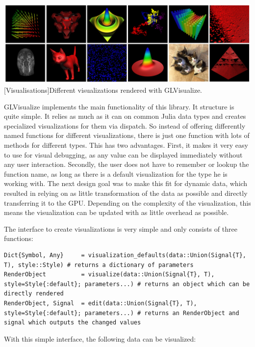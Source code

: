 \vspace{1em}
\begin{minipage}{\linewidth}
    \centering
    \includegraphics[width=0.9\linewidth]{graphics/glvisualize.jpg}
    [Visualisations]{Different visualizations rendered with GLVisualize.}
    \label{fig:glvisualize}
\end{minipage}

GLVisualize implements the main functionality of this library.
It structure is quite simple. 
It relies as much as it can on common Julia data types and creates specialized visualizations for them via dispatch.
So instead of offering differently named functions for different visualizations, there is just one function with lots of methods for different types.
This has two advantages.
First, it makes it very easy to use for visual debugging, as any value can be displayed immediately without any user interaction.
Secondly, the user does not have to remember or lookup the function name, as long as there is a default visualization for the type he is working with.
The next design goal was to make this fit for dynamic data, which resulted in relying on as little transformation of the data as possible and directly transferring it to the GPU.
Depending on the complexity of the visualization, this means the visualization can be updated with as little overhead as possible.

The interface to create visualizations is very simple and only consists of three functions:
\begin{lstlisting}
Dict{Symbol, Any}     = visualization_defaults(data::Union(Signal{T}, T), style::Style) # returns a dictionary of parameters
RenderObject 		  = visualize(data::Union(Signal{T}, T), style=Style{:default}; parameters...) # returns an object which can be directly rendered
RenderObject, Signal  = edit(data::Union(Signal{T}, T), style=Style{:default}; parameters...) # returns an RenderObject and signal which outputs the changed values

\end{lstlisting}

With this simple interface, the following data can be visualized:

